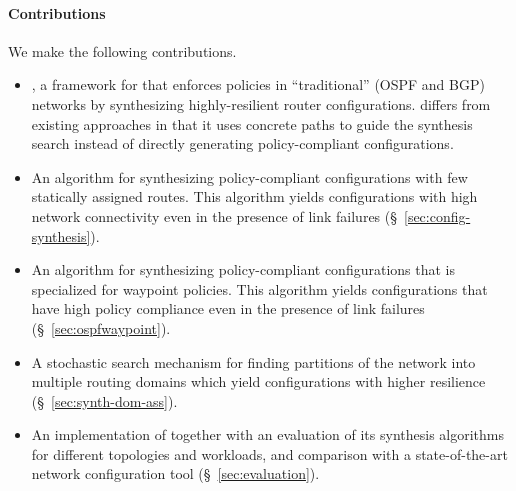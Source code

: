 \paragraph{Contributions} We make the following contributions.
\begin{itemize}	
    \item \name, a framework for
	that enforces policies in ``traditional'' (OSPF and BGP) networks
	by synthesizing highly-resilient router configurations. 		
	\name differs from existing approaches in that it uses concrete
	paths to guide the synthesis search instead of directly generating policy-compliant
	configurations.

	\item An algorithm for synthesizing policy-compliant
          configurations with few statically assigned routes. This
          algorithm yields configurations with high network
          connectivity even in the presence of link failures
          (\S~\ref{sec:config-synthesis}).

	\item An algorithm for synthesizing policy-compliant 		
		 configurations that is specialized for waypoint policies. 
		 This algorithm yields configurations that have
		 high policy compliance even in the presence of link failures (\S~\ref{sec:ospfwaypoint}). 
	
	\item A stochastic search mechanism for finding 
		partitions of the network into multiple routing domains which
		yield configurations with higher resilience (\S~\ref{sec:synth-dom-ass}).
	
	\item An implementation of \name together with an evaluation
          of its synthesis algorithms for different topologies and
          workloads, and comparison with a state-of-the-art network
          configuration tool (\S~\ref{sec:evaluation}).
\end{itemize}
